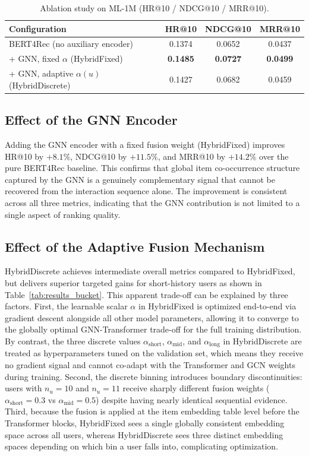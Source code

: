 \documentclass[12pt,a4paper]{report}
\begin{document}
\begin{table}[h]
\centering
\caption{Ablation study on ML-1M (HR@10 / NDCG@10 / MRR@10).}
\label{tab:ablation}
\begin{tabular}{p{6.5cm} ccc}
\toprule
\textbf{Configuration} & \textbf{HR@10} & \textbf{NDCG@10} & \textbf{MRR@10} \\
\midrule
BERT4Rec (no auxiliary encoder)      & 0.1374 & 0.0652 & 0.0437 \\
+ GNN, fixed \(\alpha\) (HybridFixed)           & \textbf{0.1485} & \textbf{0.0727} & \textbf{0.0499} \\
+ GNN, adaptive \(\alpha(u)\) (HybridDiscrete)  & 0.1427 & 0.0682 & 0.0459 \\
\bottomrule
\end{tabular}
\end{table}

\subsection*{Effect of the GNN Encoder}

Adding the GNN encoder with a fixed fusion weight (HybridFixed) improves
HR@10 by \(+8.1\%\), NDCG@10 by \(+11.5\%\), and MRR@10 by \(+14.2\%\)
over the pure BERT4Rec baseline. This confirms that global item co-occurrence
structure captured by the GNN is a genuinely complementary signal that cannot
be recovered from the interaction sequence alone. The improvement is consistent
across all three metrics, indicating that the GNN contribution is not limited
to a single aspect of ranking quality.

\subsection*{Effect of the Adaptive Fusion Mechanism}

HybridDiscrete achieves intermediate overall metrics compared to HybridFixed,
but delivers superior targeted gains for short-history users as shown in
Table~\ref{tab:results_bucket}. This apparent trade-off can be explained by
three factors. First, the learnable scalar \(\alpha\) in HybridFixed is
optimized end-to-end via gradient descent alongside all other model parameters,
allowing it to converge to the globally optimal GNN-Transformer trade-off for
the full training distribution. By contrast, the three discrete values
\(\alpha_{\text{short}}\), \(\alpha_{\text{mid}}\), and \(\alpha_{\text{long}}\)
in HybridDiscrete are treated as hyperparameters tuned on the validation set,
which means they receive no gradient signal and cannot co-adapt with the
Transformer and GCN weights during training. Second, the discrete binning
introduces boundary discontinuities: users with \(n_u = 10\) and \(n_u = 11\)
receive sharply different fusion weights (\(\alpha_{\text{short}} = 0.3\) vs
\(\alpha_{\text{mid}} = 0.5\)) despite having nearly identical sequential
evidence. Third, because the fusion is applied at the item embedding table
level before the Transformer blocks, HybridFixed sees a single globally
consistent embedding space across all users, whereas HybridDiscrete sees three
distinct embedding spaces depending on which bin a user falls into,
complicating optimization.
\end{document}
